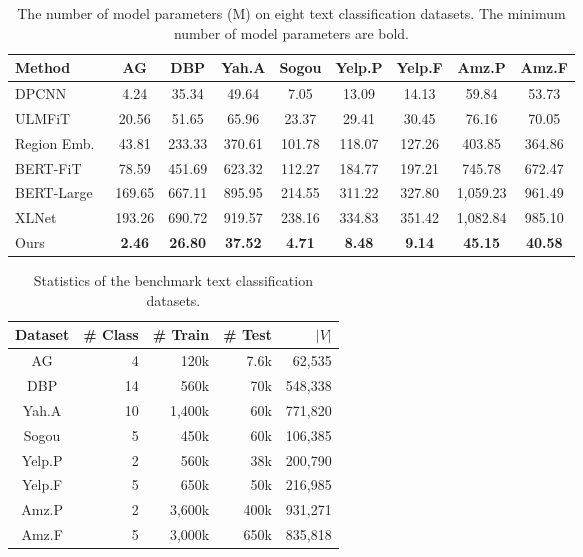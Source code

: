 \documentclass[times,twocolumn,final]{elsarticle}
\begin{document}
\begin{table*}
  \centering
  \caption{The number of model parameters (M) on eight text classification datasets. The minimum number of model parameters are bold.}
  \label{table:sota_parameter}
  \begin{tabular}{l|cccccccc}
    \toprule
    Method  & AG  & DBP  & Yah.A  & Sogou  & Yelp.P  & Yelp.F & Amz.P  & Amz.F \\
    \midrule
    DPCNN~\cite{johnson2017deep}    & 4.24  & 35.34  & 49.64 & 7.05  & 13.09  & 14.13 & 59.84 & 53.73 \\
    ULMFiT~\cite{howard2018universal}    & 20.56  & 51.65  & 65.96 & 23.37  & 29.41  & 30.45 & 76.16 & 70.05 \\
    Region Emb.~\cite{qiao2018new}    & 43.81  & 233.33  & 370.61 & 101.78  & 118.07  & 127.26 & 403.85 & 364.86 \\
    BERT-FiT~\cite{sun2019fine}    & 78.59  & 451.69  & 623.32 & 112.27  & 184.77  & 197.21 & 745.78 & 672.47 \\
    BERT-Large~\cite{xie2020unsupervised}    & 169.65 & 667.11  & 895.95 & 214.55  & 311.22  & 327.80 & 1,059.23 & 961.49 \\
    XLNet~\cite{yang2019xlnet}    & 193.26  & 690.72  & 919.57 & 238.16  & 334.83  & 351.42 & 1,082.84 & 985.10 \\
    \midrule
    Ours    & \textbf{2.46}         & \textbf{26.80}       & \textbf{37.52}      & \textbf{4.71}   & \textbf{8.48}  & \textbf{9.14} & \textbf{45.15} & \textbf{40.58} \\
    \bottomrule
  \end{tabular}
\end{table*}

\begin{table}
  \centering
  \caption{Statistics of the benchmark text classification datasets.}
  \label{table:datasets}
  \begin{tabular}{c|rrrr}
    \toprule
    Dataset   & \# Class  & \# Train & \# Test & $\vert V \vert$ \\
    \midrule
    AG    & 4        & 120k    & 7.6k   & 62,535\\
    DBP   & 14       & 560k    & 70k    & 548,338 \\
    Yah.A  & 10       & 1,400k  & 60k    & 771,820  \\ 
    Sogou   & 5        & 450k    & 60k    & 106,385  \\
    Yelp.P    & 2        & 560k    & 38k    & 200,790  \\
    Yelp.F    & 5        & 650k    & 50k    & 216,985 \\ 
    Amz.P  & 2        & 3,600k  & 400k   & 931,271 \\
    Amz.F  & 5        & 3,000k  & 650k   & 835,818  \\
    \bottomrule
  \end{tabular}
\end{table}
\end{document}
